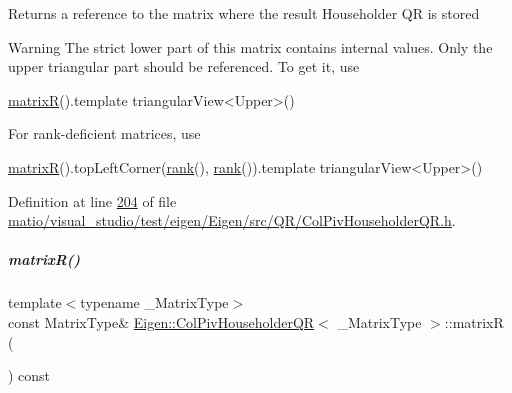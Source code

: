 \begin{DoxyReturn}{Returns}
a reference to the matrix where the result Householder QR is stored 
\end{DoxyReturn}
\begin{DoxyWarning}{Warning}
The strict lower part of this matrix contains internal values. Only the upper triangular part should be referenced. To get it, use 
\begin{DoxyCode}
\hyperlink{group___q_r___module_a44c534d47bde6b67ce4b5247d142ef30}{matrixR}().template triangularView<Upper>() 
\end{DoxyCode}
 For rank-\/deficient matrices, use 
\begin{DoxyCode}
\hyperlink{group___q_r___module_a44c534d47bde6b67ce4b5247d142ef30}{matrixR}().topLeftCorner(\hyperlink{group___q_r___module_a2a59aaa689613ce5ef0c9130ad33940e}{rank}(), \hyperlink{group___q_r___module_a2a59aaa689613ce5ef0c9130ad33940e}{rank}()).template triangularView<Upper>()
\end{DoxyCode}
 
\end{DoxyWarning}


Definition at line \hyperlink{matio_2visual__studio_2test_2eigen_2_eigen_2src_2_q_r_2_col_piv_householder_q_r_8h_source_l00204}{204} of file \hyperlink{matio_2visual__studio_2test_2eigen_2_eigen_2src_2_q_r_2_col_piv_householder_q_r_8h_source}{matio/visual\+\_\+studio/test/eigen/\+Eigen/src/\+Q\+R/\+Col\+Piv\+Householder\+Q\+R.\+h}.

\mbox{\label{group___q_r___module_a44c534d47bde6b67ce4b5247d142ef30}} 
\subparagraph{\texorpdfstring{matrix\+R()}{matrixR()}\hspace{0.1cm}{\footnotesize\ttfamily [2/2]}}
{\footnotesize\ttfamily template$<$typename \+\_\+\+Matrix\+Type$>$ \\
const Matrix\+Type\& \hyperlink{group___q_r___module_class_eigen_1_1_col_piv_householder_q_r}{Eigen\+::\+Col\+Piv\+Householder\+QR}$<$ \+\_\+\+Matrix\+Type $>$\+::matrixR (\begin{DoxyParamCaption}{ }\end{DoxyParamCaption}) const\hspace{0.3cm}{\ttfamily [inline]}}

